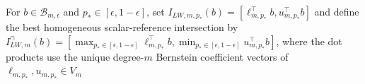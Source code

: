 For \(b\in\mathcal B_{m,\epsilon}\) and \(p_*\in[\epsilon,1-\epsilon]\), set \(I_{LW,m,p_*}(b)=[\ell_{m,p_*}^{\top}b,u_{m,p_*}^{\top}b]\) and define the best homogeneous scalar-reference intersection by \(I_{LW,m}^{\cap}(b)=[\max_{p_*\in[\epsilon,1-\epsilon]}\ell_{m,p_*}^{\top}b,\min_{p_*\in[\epsilon,1-\epsilon]}u_{m,p_*}^{\top}b]\), where the dot products use the unique degree-\(m\) Bernstein coefficient vectors of \(\ell_{m,p_*},u_{m,p_*}\in V_m\)